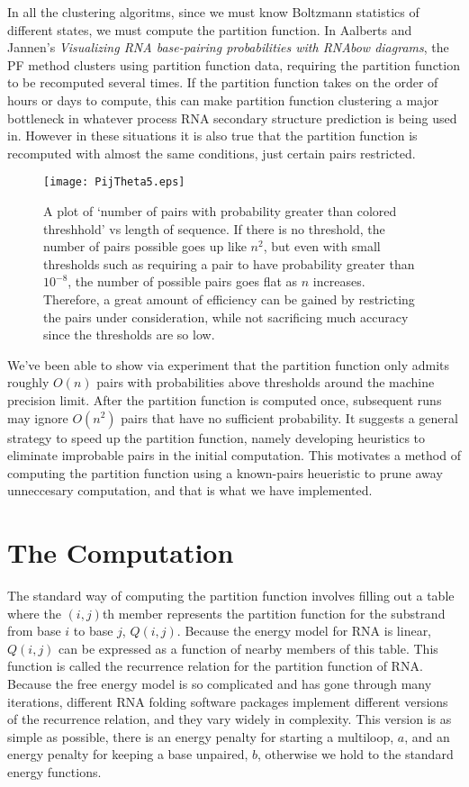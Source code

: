 In all the clustering algoritms, since we must know Boltzmann
statistics of different states, we must compute the partition
function. In Aalberts and Jannen's \emph{Visualizing RNA base-pairing
  probabilities with RNAbow diagrams}, the PF method clusters using
partition function data, requiring the partition function to be
recomputed several times. If the partition function takes on the order
of hours or days to compute, this can make partition function
clustering a major bottleneck in whatever process RNA secondary
structure prediction is being used in. However in these situations it
is also true that the partition function is recomputed with almost the
same conditions, just certain pairs restricted.

\begin{figure}[t]
\centering
\texttt{[image: PijTheta5.eps]} 
\caption{A plot of `number of pairs with probability greater than
  colored threshhold' vs length of sequence. If there is no threshold,
  the number of pairs possible goes up like $n^2$, but even with small
  thresholds such as requiring a pair to have probability greater than
  $10^{-8}$, the number of possible pairs goes flat as $n$
  increases. Therefore, a great amount of efficiency can be gained by
  restricting the pairs under consideration, while not sacrificing
  much accuracy since the thresholds are so low. }
\label{fig:probThresh}
\end{figure}

We've been able to show via experiment that the partition function
only admits roughly $O(n)$ pairs with probabilities above thresholds
around the machine precision limit. After the partition function is
computed once, subsequent runs may ignore $O(n^2)$ pairs that have no
sufficient probability. It suggests a general strategy to speed up the
partition function, namely developing heuristics to eliminate
improbable pairs in the initial computation. This motivates a method
of computing the partition function using a known-pairs heueristic to
prune away unneccesary computation, and that is what we have
implemented.

\section{The Computation}

The standard way of computing the partition function involves filling
out a table where the $(i,j)$th member represents the partition
function for the substrand from base $i$ to base $j$,
$Q(i,j)$. Because the energy model for RNA is linear, $Q(i,j)$ can be
expressed as a function of nearby members of this table. This function
is called the recurrence relation for the partition function of
RNA. Because the free energy model is so complicated and has gone
through many iterations, different RNA folding software packages
implement different versions of the recurrence relation, and they vary
widely in complexity. This version is as simple as possible, there is
an energy penalty for starting a multiloop, $a$, and an energy penalty
for keeping a base unpaired, $b$, otherwise we hold to the standard
energy functions.


